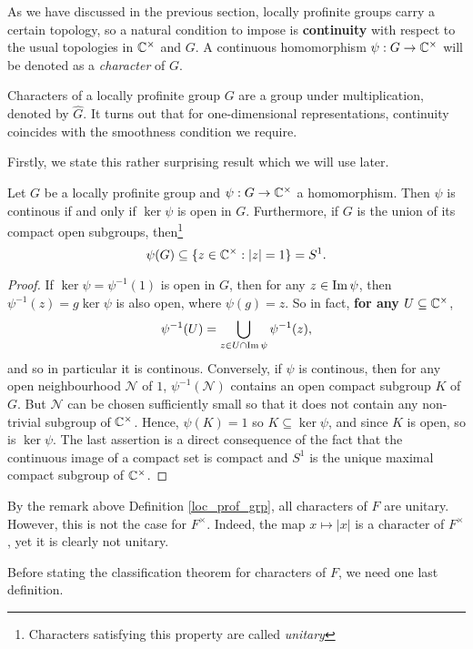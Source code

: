 As we have discussed in the previous section, locally profinite groups carry a certain topology, so a natural condition to impose is \textbf{continuity} with respect to the usual topologies in $\mathbb{C}^{\times}$ and $G$. A continuous homomorphism $\psi:G\rightarrow\mathbb{C}^{\times}$ will be denoted as a \textit{character} of $G$.

Characters of a locally profinite group $G$ are a group under multiplication, denoted by $\hat{G}$. It turns out that for one-dimensional representations, continuity coincides with the smoothness condition we require. 

Firstly, we state this rather surprising result which we will use later. 

\begin{lemma}
    Let $G$ be a locally profinite group and $\psi: G\rightarrow\mathbb{C}^{\times}$ a homomorphism. Then $\psi$ is continous if and only if $\ker\psi$ is open in $G$. Furthermore, if $G$ is the union of its compact open subgroups, then\footnote{Characters satisfying this property are called \textit{unitary}} $$\psi(G)\subseteq\{z\in\mathbb{C}^{\times}:|z|=1\}=S^1.$$
\end{lemma}
\begin{proof}
    If $\ker\psi=\psi^{-1}(1)$ is open in $G$, then for any $z\in\operatorname{Im}\psi$, then $\psi^{-1}(z)=g\ker\psi$ is also open, where $\psi(g)=z$. So in fact, \textbf{for any} $U\subseteq\mathbb{C}^{\times}$, 
    $$\psi^{-1}(U)=\bigcup_{z\in U\cap\operatorname{Im}\psi}\psi^{-1}(z),$$
    and so in particular it is continous.
    Conversely, if $\psi$ is continous, then for any open neighbourhood $\mathcal{N}$ of $1$, $\psi^{-1}(\mathcal{N})$ contains an open compact subgroup $K$ of $G$. But $\mathcal{N}$ can be chosen sufficiently small so that it does not contain any non-trivial subgroup of $\mathbb{C}^{\times}$. Hence, $\psi(K)=1$ so $K\subseteq\ker\psi$, and since $K$ is open, so is $\ker\psi$.
    The last assertion is a direct consequence of the fact that the continuous image of a compact set is compact and $S^1$ is the unique maximal compact subgroup of $\mathbb{C}^{\times}$.
\end{proof}

By the remark above Definition \ref{loc_prof_grp}, all characters of $F$ are unitary. However, this is not the case for $F^{\times}$. Indeed, the map $x\mapsto|x|$ is a character of $F^{\times}$, yet it is clearly not unitary. 

Before stating the classification theorem for   characters of $F$, we need one last definition. 


